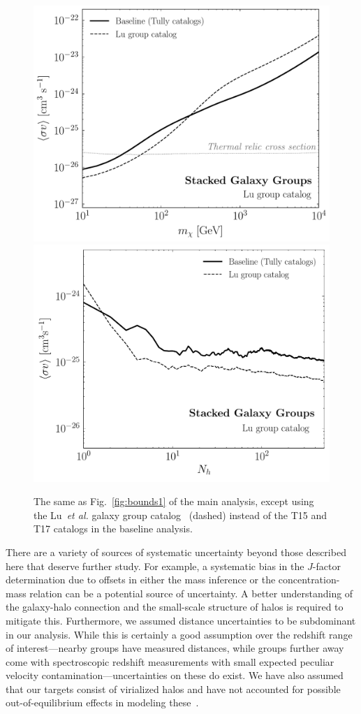 \begin{figure}[t]
  \centering
  \includegraphics[width=.45\textwidth]{ch-clusters/plots/systematics_lu.pdf}
   \includegraphics[width=.45\textwidth]{ch-clusters/plots/systematics_lu_elephant.pdf} 
  \caption{The same as Fig.~\ref{fig:bounds1} of the main analysis, except using the Lu~\emph{et al.} galaxy group catalog~\cite{Lu:2016vmu} (dashed) instead of the T15 and T17 catalogs in the baseline analysis. }
  \label{fig:lucatalog}
\end{figure}

\noindent There are a variety of sources of systematic uncertainty beyond those described here that  deserve further study.  For example, a systematic bias in the $J$-factor determination due to offsets in either the mass inference or the concentration-mass relation can be a potential source of uncertainty. A better understanding of the galaxy-halo connection and the small-scale structure of halos is required to mitigate this. Furthermore, we assumed distance uncertainties to be subdominant in our analysis. While this is certainly a good assumption over the redshift range of interest---nearby groups have measured distances, while groups further away come with spectroscopic redshift measurements with small expected peculiar velocity contamination---uncertainties on these do exist. We have also assumed that our targets consist of virialized halos and have not accounted for possible out-of-equilibrium effects in modeling these~\cite{1993AJ....105.2035D}.

\sectionline